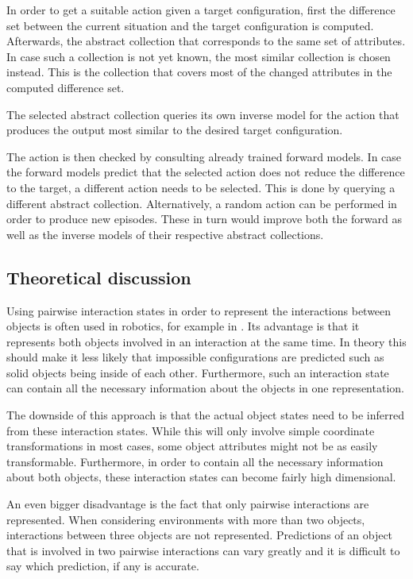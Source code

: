 In order to get a suitable action given a target configuration, first the 
difference set between the current situation and the target 
configuration is computed. Afterwards, the abstract collection that corresponds to the same set of attributes. In case such a collection is not yet known, the 
most similar collection is chosen instead. This is the collection that covers 
most of the changed attributes in the computed difference set. 

The selected abstract collection queries its own inverse model for the 
action that produces the output most similar to the desired target configuration. 

The action is then checked by consulting already trained forward models. In case the forward models predict that the selected action does not reduce the difference to the target, a different action needs to be selected. This is done by querying a different abstract collection. Alternatively, a random action can be performed in order to produce new episodes. These in turn would improve both the forward as well as the inverse models of their respective abstract collections.

\subsection{Theoretical discussion}

Using pairwise interaction states in order to represent the interactions between objects is often used in robotics, for example in \cite{pairwiseExample}. Its advantage is that it represents both objects involved in an interaction at the same time. In theory this should make it less likely that impossible configurations are predicted such as solid objects being inside of each other. Furthermore, such an interaction state can contain all the necessary information about the objects in one representation. 

The downside of this approach is that the actual object states need to be inferred from these interaction states. While this will only involve simple coordinate transformations in most cases, some object attributes might not be as easily transformable. Furthermore, in order to contain all the necessary information about both objects, these interaction states can become fairly high dimensional. 

An even bigger disadvantage is the fact that only pairwise interactions are represented. When considering environments with more than two objects, interactions between three objects are not represented. Predictions of an object that is involved in two pairwise interactions can vary greatly and it is difficult to say which prediction, if any is accurate.

